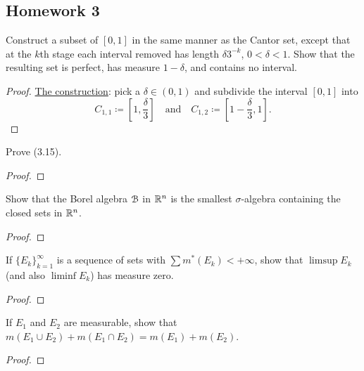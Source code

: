 \subsection{Homework 3}
\begin{problem}
  Construct a subset of $[0,1]$ in the same manner as the Cantor set,
  except that at the $k$th stage each interval removed has length
  $\delta 3^{-k}$, $0<\delta<1$. Show that the resulting set is perfect,
  has measure $1-\delta$, and contains no interval.
\end{problem}
\begin{proof}
\underline{The construction}: pick a $\delta\in(0,1)$ and subdivide the
interval $[0,1]$ into
\[
  C_{1,1}\coloneq\left[1,\frac{\delta}{3}\right]\quad\text{and}\quad
  C_{1,2}\coloneq\left[1-\frac{\delta}{3},1\right].
\]

\end{proof}

\begin{problem}
  Prove (3.15).
\end{problem}
\begin{proof}
\end{proof}

\begin{problem}
  Show that the Borel algebra $\mathcal{B}$ in $\mathbb{R}^n$ is the smallest
  $\sigma$-algebra containing the closed sets in $\mathbb{R}^n$.
\end{problem}
\begin{proof}
\end{proof}

\begin{problem}
  If ${\{E_k\}}_{k=1}^\infty$ is a sequence of sets with
  $\sum m^*(E_k)<+\infty$, show that $\limsup E_k$ (and also $\liminf E_k$)
  has measure zero.
\end{problem}
\begin{proof}
\end{proof}

\begin{problem}
  If $E_1$ and $E_2$ are measurable, show that
  $m(E_1\cup E_2)+m(E_1\cap E_2)=m(E_1)+m(E_2)$.
\end{problem}
\begin{proof}
\end{proof}

